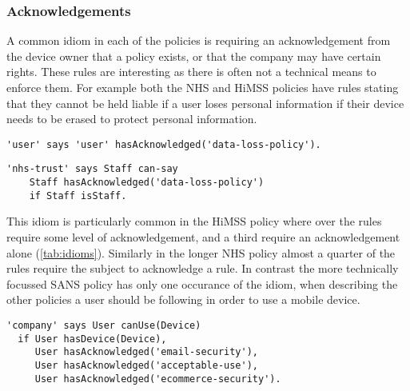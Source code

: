 \documentclass[a4paper]{article}
\begin{document}
\subsubsection{Acknowledgements}

A common idiom in each of the policies is requiring an acknowledgement from the device owner that a policy exists, or that the company may have certain rights.  
These rules are interesting as there is often not a technical means to enforce them.
For example both the NHS and HiMSS policies have rules stating that they cannot be held liable if a user loses personal information if their device needs to be erased to protect personal information.

\begin{lstlisting}[title={\footnotesize\textbf{\ac{HiMSS}}:~\itshape 
I agree to hold XYZ Health System harmless for any loss relating to the administration of PDA/Smartphone connectivity to XYZ Health System systems including, but not limited to, loss of personal information stored on a PDA/Smartphone due to data deletion done to protect sensitive information related to XYZ Health System, its patients, members or partners.}]
'user' says 'user' hasAcknowledged('data-loss-policy').
\end{lstlisting}

\begin{lstlisting}[title={\footnotesize\textbf{NHS}:~\itshape 
Individuals who have personal data of any kind stored on a corporately issued mobile device must be aware that in the event of loss of the device the above data wipe will include removal of all personal data.}]
'nhs-trust' says Staff can-say
	Staff hasAcknowledged('data-loss-policy') 
	if Staff isStaff.
\end{lstlisting}

This idiom is particularly common in the \ac{HiMSS} policy where over the rules require some level of acknowledgement, and a third require an acknowledgement alone (\autoref{tab:idioms}).
Similarly in the longer NHS policy almost a quarter of the rules require the subject to acknowledge a rule.
In contrast the more technically focussed SANS policy has only one occurance of the idiom, when describing the other policies a user should be following in order to use a mobile device.

\begin{lstlisting}[title={\footnotesize\textbf{SANS}:~\itshape 
Users MUST agree to the email security/acceptable use policy and eventually to the eCommerce security policy.}]
'company' says User canUse(Device) 
  if User hasDevice(Device),
     User hasAcknowledged('email-security'),
     User hasAcknowledged('acceptable-use'), 
     User hasAcknowledged('ecommerce-security').
\end{lstlisting}
\end{document}
